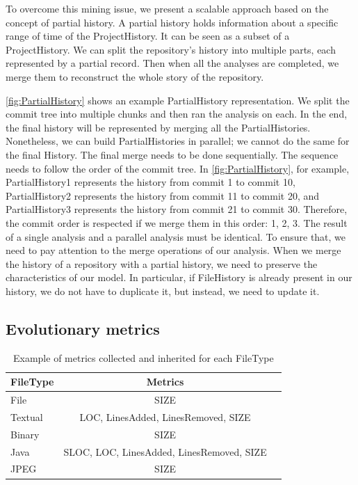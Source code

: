To overcome this mining issue, we present a scalable approach based on the concept of partial history.
A partial history holds information about a specific range of time of the ProjectHistory. 
It can be seen as a subset of a ProjectHistory. 
We can split the repository's history into multiple parts, each represented by a partial record. Then when all the analyses are completed, we merge them to reconstruct the whole story of the repository.


\autoref{fig:PartialHistory} shows an example PartialHistory representation. 
We split the commit tree into multiple chunks and then ran the analysis on each. 
In the end, the final history will be represented by merging all the PartialHistories. 
Nonetheless, we can build PartialHistories in parallel; we cannot do the same for the final History. 
The final merge needs to be done sequentially. The sequence needs to follow the order of the commit tree. 
In \autoref{fig:PartialHistory}, for example,
PartialHistory1 represents the history from commit 1 to commit 10, 
PartialHistory2 represents the history from commit 11 to commit 20, and 
PartialHistory3 represents the history from commit 21 to commit 30.
Therefore, the commit order is respected if we merge them in this order: 1, 2, 3. 
The result of a single analysis and a parallel analysis must be identical. 
To ensure that, we need to pay attention to the merge operations of our analysis.
When we merge the history of a repository with a partial history, we need to preserve the characteristics of our model. 
In particular, if FileHistory is already present in our history, we do not have to duplicate it, but instead, we need to update it. 
\label{s:evolutionaryMetrics}
\subsection*{Evolutionary metrics}

\begin{table}[ht]
    \centering
    \begin{tabular}{lcr} \hline
        {\bf FileType} & {\bf Metrics}\\ \hline
        File    & SIZE      \\
        Textual & LOC, LinesAdded, LinesRemoved, SIZE \\
        Binary  & SIZE         \\
        Java    & SLOC, LOC, LinesAdded, LinesRemoved, SIZE \\
        JPEG    & SIZE \\
    \end{tabular}
    \caption{Example of metrics collected and inherited for each FileType}
    \label{table:metricsT}
\end{table}

